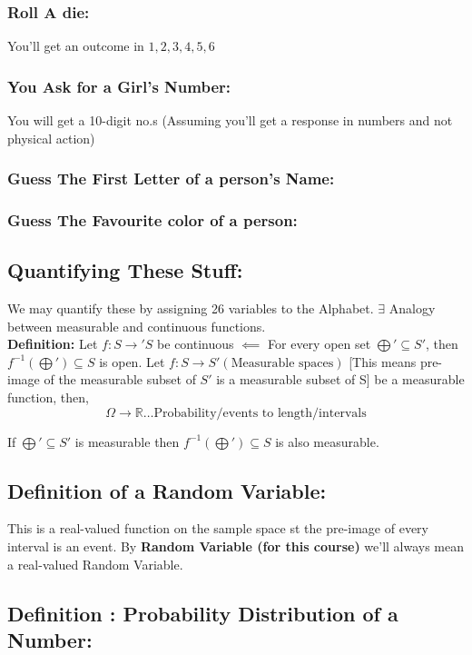 \documentclass{article}
\theoremstyle{definition}
\begin{document}
{\subsubsection{Roll A die:}
You'll get an outcome in ${1,2,3,4,5,6}$

\subsubsection{You Ask for a Girl's Number:}
You will get a 10-digit no.s (Assuming you'll get a response in numbers and not physical action)

\subsubsection{Guess The First Letter of a person's Name:}
\subsubsection{Guess The Favourite color of a person:}
\subsection{Quantifying These Stuff:}
We may quantify these by assigning 26 variables to the Alphabet.
$\exists$ Analogy between measurable and continuous functions.
\\
\textbf{Definition: } Let $f: S \to \prime S$ be continuous $\impliedby$ For every open set $\bigoplus ' \subseteq S'$, then  $f^{-1} (\bigoplus ') \subseteq S$ is open.
Let $f: S \to  S' (\text{Measurable spaces})$ [This means pre-image of the measurable subset of $S'$ is a measurable subset of S] be a measurable function, then,
\[
\Omega \to \mathbb{R} \dots \text{Probability/events to length/intervals}
\]

If $\bigoplus ' \subseteq S'$ is measurable then $f^{-1} (\bigoplus ') \subseteq S$ is also measurable. 

\subsection{Definition of a Random Variable:}

This is a real-valued function on the sample space st the pre-image of every interval is an event.
By \textbf{Random Variable (for this course)} we'll always mean a real-valued  Random Variable.
\subsection{Definition : Probability Distribution of a Number:}

}
\end{document}
